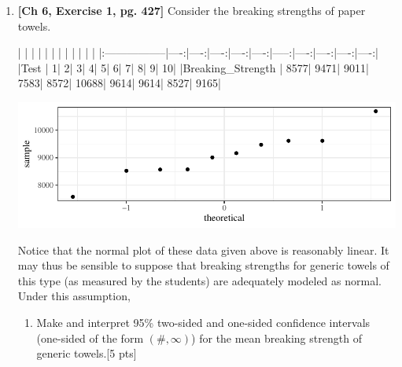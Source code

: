 \documentclass[11pt]{article}\usepackage[]{graphicx}\usepackage[]{color}
\begin{document}
\begin{enumerate}
    
 \item \textbf{[Ch 6, Exercise 1, pg. 427]} Consider the breaking strengths of paper towels.
 
\begin{Schunk}
\begin{Soutput}
|                  |     |     |     |     |     |      |     |     |     |     |
|:-----------------|----:|----:|----:|----:|----:|-----:|----:|----:|----:|----:|
|Test              |    1|    2|    3|    4|    5|     6|    7|    8|    9|   10|
|Breaking_Strength | 8577| 9471| 9011| 7583| 8572| 10688| 9614| 9614| 8527| 9165|
\end{Soutput}
\end{Schunk}
\includegraphics{stat305_hw8-003}

    Notice that the normal plot of these data given above is reasonably linear. It may thus be sensible to suppose that breaking strengths for generic towels of this type (as measured by the students) are adequately modeled as normal. Under this assumption,
          \begin{enumerate}
            \item Make and interpret 95\% two-sided and one-sided confidence intervals (one-sided of the form $(\#, \infty)$) for the mean breaking strength of generic towels.[5 pts]
    


\end{enumerate}
\end{enumerate}
\end{document}
